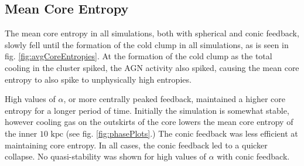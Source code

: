 \documentclass[iop,apjl, twocolappendix]{emulateapj}   %
\def\FG#1{{\textcolor{ForestGreen}{\textbf{\textit{ FG: #1}}}}}
\begin{document}

\subsection{Mean Core Entropy} 
\label{sec:mean_core_entropy}

The mean core entropy in all simulations, both with spherical and conic
feedback, slowly fell until the formation of the cold clump in all simulations,
as is seen in fig.  \ref{fig:avgCoreEntropies}. At the formation of the cold
clump as the total cooling in the cluster spiked, the AGN activity also spiked,
causing the mean core entropy to also spike to unphysically high entropies.

High values of $\alpha$, or more centrally peaked feedback, maintained a higher
core entropy for a longer period of time. Initially the simulation is somewhat
stable, however cooling gas on the outskirts of the core lowers the mean core
entropy of the inner $10 \text{ kpc}$ (see fig. \ref{fig:phasePlots}.)  The
conic feedback was less efficient at maintaining core entropy. In all cases,
the conic feedback led to a quicker collapse. No quasi-stability was shown for
high values of $\alpha$ with conic feedback.

\end{document}
